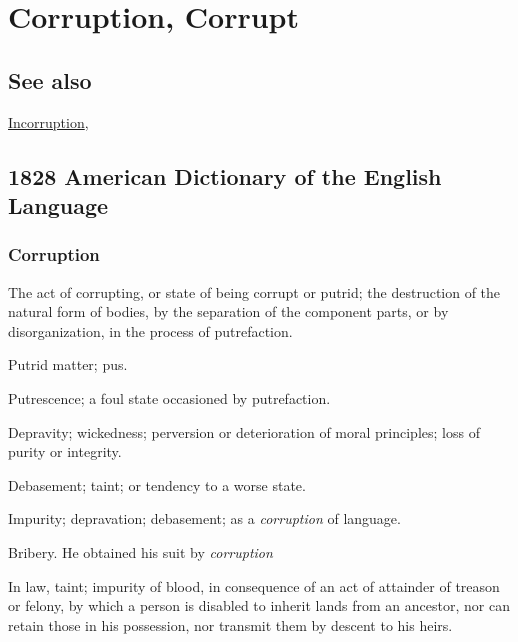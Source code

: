 \section{Corruption, Corrupt}
	\label{CORRUPTION}
	
\subsection{See also}

	\hyperref[INCORRUPTION]{Incorruption},

\subsection{1828 American Dictionary of the English Language} %
	\label{CORRUPTION-1828}
	
	\subsubsection{Corruption}

		\begin{compactitem}
			\item[1] The act of corrupting, or state of being corrupt or putrid; the destruction of the natural form of bodies, by the separation of the component parts, or by disorganization, in the process of putrefaction.
			\item[2] Putrid matter; pus.
			\item[3] Putrescence; a foul state occasioned by putrefaction.
			\item[4] Depravity; wickedness; perversion or deterioration of moral principles; loss of purity or integrity.
			\item[5] Debasement; taint; or tendency to a worse state.
			\item[6] Impurity; depravation; debasement; as a \textit{corruption} of language.
			\item[7] Bribery. He obtained his suit by \textit{corruption}
			\item[8] In law, taint; impurity of blood, in consequence of an act of attainder of treason or felony, by which a person is disabled to inherit lands from an ancestor, nor can retain those in his possession, nor transmit them by descent to his heirs.
		\end{compactitem}
		
